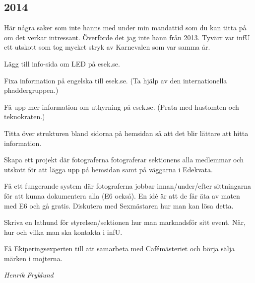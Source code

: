 \documentclass[10pt]{article}
\begin{document}
\subsection{2014}
Här några saker som inte hanns med under min mandattid som du kan titta på om det verkar intressant. Överförde det jag inte hann från 2013. Tyvärr var infU ett utskott som tog mycket stryk av Karnevalen som var samma år.
\begin{tightdashlist}
    \item Lägg till info-sida om LED på esek.se.
    \item Fixa information på engelska till esek.se. (Ta hjälp av den internationella phaddergruppen.)
    \item Få upp mer information om uthyrning på esek.se. (Prata med hustomten och teknokraten.)
    \item Titta över strukturen bland sidorna på hemsidan så att det blir lättare att hitta information.
    \item Skapa ett projekt där fotograferna fotograferar sektionens alla medlemmar och utskott för att lägga upp på hemsidan samt på väggarna i Edekvata.
    \item Få ett fungerande system där fotograferna jobbar innan/under/efter sittningarna för att kunna dokumentera alla (E6 också). En idé är att de får äta av maten med E6 och gå gratis. Diskutera med Sexmästaren hur man kan lösa detta.
    \item Skriva en lathund för styrelsen/sektionen hur man marknadsför sitt event. När, hur och vilka man ska kontakta i infU.
    \item Få Ekiperingsexperten till att samarbeta med Cafémästeriet och börja sälja märken i mojterna.
\end{tightdashlist}

\emph{Henrik Fryklund}
\end{document}
